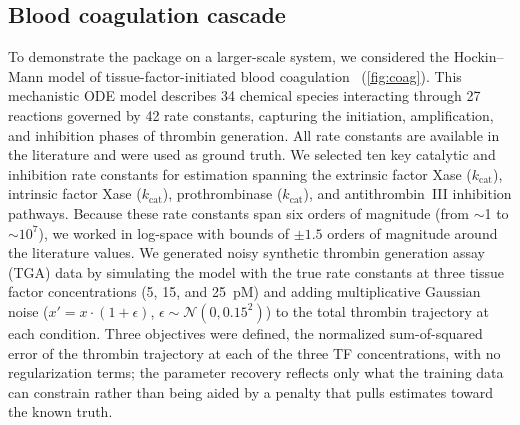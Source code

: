 \documentclass[preprint,review,12pt]{elsarticle}
\begin{document}
\subsection{Blood coagulation cascade}\label{sec:coag}
To demonstrate the package on a larger-scale system, we considered the Hockin--Mann model of tissue-factor-initiated blood coagulation~\cite{HockinMann2002} (\cref{fig:coag}). This mechanistic ODE model describes 34 chemical species interacting through 27 reactions governed by 42 rate constants, capturing the initiation, amplification, and inhibition phases of thrombin generation. All rate constants are available in the literature and were used as ground truth. We selected ten key catalytic and inhibition rate constants for estimation spanning the extrinsic factor Xase ($k_{\text{cat}}$), intrinsic factor Xase ($k_{\text{cat}}$), prothrombinase ($k_{\text{cat}}$), and antithrombin~III inhibition pathways.
Because these rate constants span six orders of magnitude (from $\sim$1 to $\sim 10^7$), we worked in log-space with bounds of $\pm 1.5$ orders of magnitude around the literature values. We generated noisy synthetic thrombin generation assay (TGA) data by simulating the model with the true rate constants at three tissue factor concentrations (5, 15, and 25~pM) and adding multiplicative Gaussian noise ($x' = x \cdot (1 + \epsilon)$, $\epsilon \sim \mathcal{N}(0, 0.15^2)$) to the total thrombin trajectory at each condition. Three objectives were defined, the normalized sum-of-squared error of the thrombin trajectory at each of the three TF concentrations, with no regularization terms; the parameter recovery reflects only what the training data can constrain rather than being aided by a penalty that pulls estimates toward the known truth.
\end{document}
